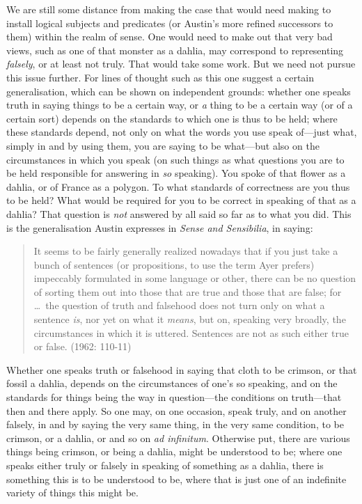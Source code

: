 We are still some distance from making the case that would need making to install logical subjects and predicates (or Austin’s more refined successors to them) within the realm of sense. One would need to make out that very bad views, such as one of that monster as a dahlia, may correspond to representing \emph{falsely}, or at least not truly. That would take some work. But we need not pursue this issue further. For lines of thought such as this one suggest a certain generalisation, which can be shown on independent grounds: whether one speaks truth in saying things to be a certain way, or \emph{a} thing to be a certain way (or of a certain sort) depends on the standards to which one is thus to be held; where these standards depend, not only on what the words you use speak of—just what, simply in and by using them, you are saying to be what—but also on the circumstances in which you speak (on such things as what questions you are to be held responsible for answering in \emph{so} speaking). You spoke of that flower as a dahlia, or of France as a polygon. To what standards of correctness are you thus to be held? What would be required for you to be correct in speaking of that as a dahlia? That question is \emph{not} answered by all said so far as to what you did. This is the generalisation Austin expresses in \emph{Sense and Sensibilia}, in saying:
\begin{quote}
	It seems to be fairly generally realized nowadays that if you just take a bunch of sentences (or propositions, to use the term Ayer prefers) impeccably formulated in some language or other, there can be no question of sorting them out into those that are true and those that are false; for \ldots\ the question of truth and falsehood does not turn only on what a sentence \emph{is}, nor yet on what it \emph{means}, but on, speaking very broadly, the circumstances in which it is uttered. Sentences are not as such either true or false. (1962: 110-11)
\end{quote}
Whether one speaks truth or falsehood in saying that cloth to be crimson, or that fossil a dahlia, depends on the circumstances of one’s so speaking, and on the standards for things being the way in question---the conditions on truth---that then and there apply. So one may, on one occasion, speak truly, and on another falsely, in and by saying the very same thing, in the very same condition, to be crimson, or a dahlia, or and so on \emph{ad infinitum}. Otherwise put, there are various things being crimson, or being a dahlia, might be understood to be; where one speaks either truly or falsely in speaking of something as a dahlia, there is something this is to be understood to be, where that is just one of an indefinite variety of things this might be.


